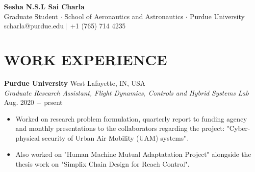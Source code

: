 \documentclass[letterpaper,11pt]{article}
\begin{document}
\begin{center}
\thispagestyle{empty}
\huge \textbf{Sesha N.S.L Sai Charla \\}
\small Graduate Student $\cdot$ School of Aeronautics and Astronautics $\cdot$ Purdue University\\
\small scharla@purdue.edu $\mid$ +1 (765) 714 4235   \\
\end{center}





% 
%
\section{WORK EXPERIENCE} 
\noindent \textbf{Purdue University} \hfill West Lafayette, IN, USA \\
\noindent \textit{Graduate Research Assistant, Flight Dynamics, Controls and Hybrid Systems Lab} \hfill Aug. 2020 $-$ prsent
\begin{itemize}[noitemsep,nolistsep,leftmargin=0.25in,label={--}]
    \item Worked on research problem formulation, quarterly report to funding agency and monthly presentations to the collaborators regarding the project: "Cyber-physical security of Urban Air Mobility (UAM) systems".
    \item Also worked on "Human Machine Mutual Adaptatation Project" alongside the thesis work on "Simplix Chain Design for Reach Control".
\end{itemize}
\end{document}
